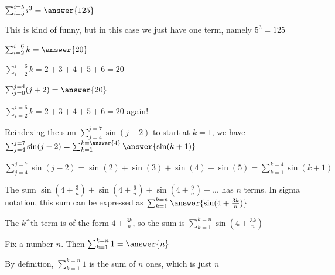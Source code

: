 \documentclass{ximera}
\begin{document}
\begin{question}
	$\sum_{i=5}^{i=5} i^3 = \answer{125}$
	\begin{hint}
		This is kind of funny, but in this case we just have one term, namely $5^3 = 125$
	\end{hint}
\end{question}

\begin{question}
	$\sum_{i=2}^{i=6} k = \answer{20}$
	 \begin{hint}
	 	$\sum_{i=2}^{i=6} k = 2+3+4+5+6 = 20$
	 \end{hint}
	
	$\sum_{j=0}^{j=4} (j+2) = \answer{20}$
	 \begin{hint}
	 	$\sum_{i=2}^{i=6} k = 2+3+4+5+6 = 20$ again!
	 \end{hint}
	
\end{question}

\begin{question}
	Reindexing the sum $\sum_{j=4}^{j=7} \sin(j-2)$ to start at $k=1$, we have $\sum_{j=4}^{j=7} \sin(j-2) = \sum_{k=1}^{k=\answer{4}} \answer{\sin(k+1)}$
		\begin{hint}
			$\sum_{j=4}^{j=7} \sin(j-2) = \sin(2)+\sin(3) + \sin(4)+\sin(5) = \sum_{k=1}^{k=4} \sin(k+1)$
		\end{hint}
\end{question}

\begin{question}
	The sum $\sin(4+\frac{3}{n}) + \sin(4+\frac{6}{n})+\sin(4+\frac{9}{n})+...$ has $n$ terms. In sigma notation, this sum can be expressed as $\sum_{k=1}^{k=n} \answer{ \sin(4+\frac{3k}{n})}$
		\begin{hint}
			The $k$^{th} term is of the form $4+\frac{3k}{n}$, so the sum is $\sum_{k=1}^{k=n} \sin(4+\frac{3k}{n})$
		\end{hint}
\end{question}

\begin{question}
	Fix a number $n$.  Then $\sum_{k=1}^{k=n} 1 = \answer{n}$
	 \begin{hint}
	 	By definition, $\sum_{k=1}^{k=n} 1$ is the sum of $n$ ones, which is just $n$
	 \end{hint}
\end{question}
\end{document}
